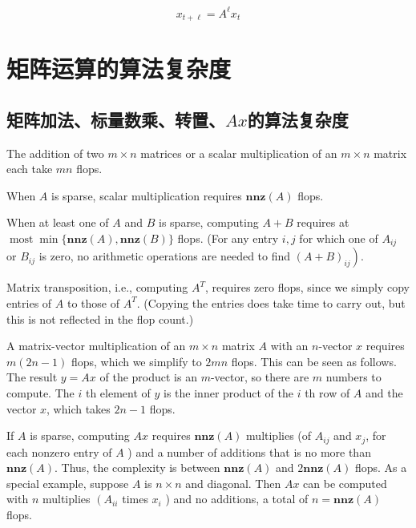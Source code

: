 \begin{example}
    \begin{equation} x_{t+\ell}=A^{\ell} x_{t} \end{equation}
\end{example}

\section{矩阵运算的算法复杂度}

\subsection{矩阵加法、标量数乘、转置、$Ax$的算法复杂度}

The addition of two $ m \times n $ matrices or a scalar multiplication of an $ m \times n $ matrix each take $ m n $ flops.

When $ A $ is sparse, scalar multiplication requires $ \mathbf{n n z}(A) $ flops. 

When at least one of $ A $ and $ B $ is sparse, computing $ A+B $ requires at $ \operatorname{most} \min \{\mathbf{n n z}(A), \mathbf{n n z}(B)\} $ flops. (For any entry $ i, j $ for which one of $ A_{i j} $ or $ B_{i j} $ is zero, no arithmetic operations are needed to find $ \left.(A+B)_{i j} \right) $.

Matrix transposition, i.e., computing $ A^{T} $, requires zero flops, since we simply copy entries of $ A $ to those of $ A^{T} $. (Copying the entries does take time to carry out, but this is not reflected in the flop count.)

A matrix-vector multiplication of an $ m \times n $ matrix $ A $ with an $ n $-vector $ x $ requires $ m(2 n-1) $ flops, which we simplify to $ 2 m n $ flops. This can be seen as follows. The result $ y=A x $ of the product is an $ m $-vector, so there are $ m $ numbers to compute. The $ i $ th element of $ y $ is the inner product of the $ i $ th row of $ A $ and the vector $ x $, which takes $ 2 n-1 $ flops.

If $ A $ is sparse, computing $ A x $ requires $ \mathbf{n n z}(A) $ multiplies (of $ A_{i j} $ and $ x_{j} $, for each nonzero entry of $ A $ ) and a number of additions that is no more than $ \mathbf{n n z}(A) $. Thus, the complexity is between $ \mathbf{n n z}(A) $ and $ 2 \mathbf{n n z}(A) $ flops. As a special example, suppose $ A $ is $ n \times n $ and diagonal. Then $ A x $ can be computed with $ n $ multiplies $ \left(A_{i i}\right. $ times $ x_{i} $ ) and no additions, a total of $ n=\mathbf{n n z}(A) $ flops.


